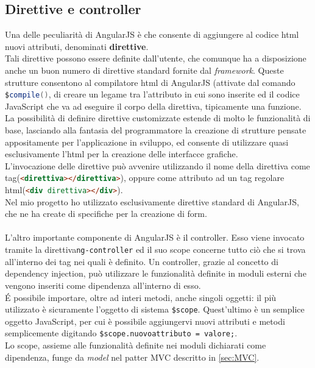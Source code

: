\subsection{Direttive e controller}
Una delle peculiarità di  AngularJS è che consente di aggiungere al codice \gls{html} nuovi attributi, denominati \textbf{direttive}.\\
Tali direttive possono essere definite dall'utente, che comunque ha a disposizione anche un buon numero di 
direttive standard fornite dal \emph{framework}. Queste strutture consentono al compilatore \gls{html} di AngularJS (attivate dal comando \lstinline[language=Java]!$compile()!, di creare un legame tra l'attributo in cui sono inserite ed il codice JavaScript che va ad eseguire il corpo della direttiva, tipicamente una funzione.\\
La possibilità di definire direttive customizzate estende di molto le funzionalità di base, lasciando alla fantasia del programmatore la creazione di strutture pensate appositamente per l'applicazione in sviluppo, ed consente di utilizzare quasi esclusivamente l'\gls{html} per la creazione delle interfacce grafiche.\\
L'invocazione delle direttive può avvenire utilizzando il nome della direttiva come tag(\lstinline[language=HTML]!<direttiva></direttiva>!), oppure come attributo ad un tag regolare \gls{html}(\lstinline[language=HTML]!<div direttiva></div>!).\\
Nel mio progetto ho utilizzato esclusivamente direttive standard di AngularJS, che ne ha create di specifiche per la creazione di form.\\
\\
L'altro importante componente di AngularJS è il controller. Esso viene invocato tramite la direttiva\lstinline[language=HTML]!ng-controller! ed il suo scope concerne tutto ciò che si trova all'interno dei tag nei quali è definito. Un controller, grazie al concetto di dependency injection, può utilizzare le funzionalità definite in moduli esterni che vengono inseriti come dipendenza all'interno di esso.\\ \'E possibile importare, oltre ad interi metodi, anche singoli oggetti: il più utilizzato è sicuramente l'oggetto di sistema  \lstinline[language=HTML]!$scope!. Quest'ultimo è un semplice oggetto JavaScript, per cui è possibile aggiungervi nuovi attributi e metodi semplicemente digitando \lstinline[language=HTML]!$scope.nuovoattributo = valore;!. \\Lo scope, assieme alle funzionalità definite nei moduli dichiarati come dipendenza, funge da \emph{model} nel patter MVC descritto in \ref{sec:MVC}.\\
